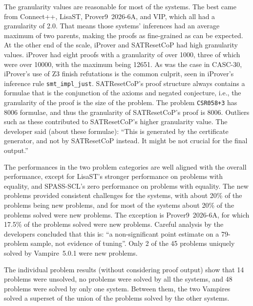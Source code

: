 \documentclass[aic]{iosart2x}
\newcommand{\smalltt}[1]{\small \texttt{#1}}
\newcommand{\LAST}{\mbox{CASC-30}}
\begin{document}
The granularity values are reasonable for most of the systems.
The best came from Connect++, LisaST, Prover9~2026-6A, and VIP, which all had a granularity of 2.0. 
That means those systems' inferences had an average maximum of two parents, making the proofs as 
fine-grained as can be expected.
At the other end of the scale, iProver and SATResetCoP had high granularity values.
iProver had eight proofs with a granularity of over 1000, three of which were over 10000, with
the maximum being 12651.
As was the case in \LAST{}, iProver's use of Z3 finish refutations is the common culprit,
seen in iProver's inference rule \smalltt{smt\_impl\_just}.
SATResetCoP's proof structure always contains a formulae that is the conjunction of the axioms
and negated conjecture, i.e., the granularity of the proof is the size of the problem.
The problem \smalltt{CSR058+3} has 8006 formulae, and thus the granularity of SATResetCoP's proof 
is 8006.
Outliers such as these contributed to SATResetCoP's higher granularity value.
The developer said (about these formulae): ``This is generated by the certificate generator, and 
not by SATResetCoP instead. It might be not crucial for the final output.''

The performances in the two problem categories are well aligned with the overall performance,
except for LisaST's stronger performance on problems with equality, and SPASS-SCL's zero 
performance on problems with equality.
The new problems provided consistent challenges for the systems, with about 20\% of the problems
being new problems, and for most of the systems about 20\% of the problems solved were new 
problems.
The exception is Prover9~2026-6A, for which 17.5\% of the problems solved were new problems.
Careful analysis by the developers concluded that this is: ``a non-significant point estimate 
on a 79-problem sample, not evidence of tuning''.
Only 2 of the 45 problems uniquely solved by Vampire~5.0.1 were new problems.

The individual problem results (without considering proof output) show that
14 problems were unsolved,
no problems were solved by all the systems, and
48 problems were solved by only one system.
Between them, the two Vampires solved a superset of the union of the problems solved by 
the other systems.
\end{document}
